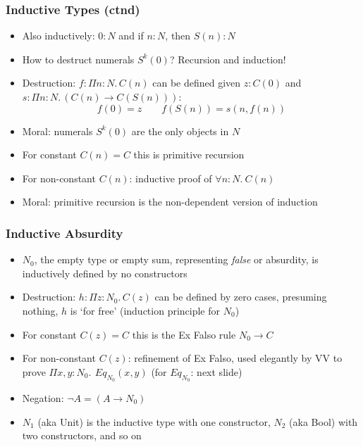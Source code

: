 \documentclass[handout]{beamer}
\newcommand{\depi}[3]{\Pi{#1{:}#2.\,#3}}
\begin{document}
\frame
  {

    \frametitle{Inductive Types (ctnd)}

    \begin{itemize}[<+->]
    \item Also inductively: $0:N$ and if $n:N$, then $S(n): N$
    \item How to destruct numerals $S^k (0)$? Recursion and induction!
    \item Destruction: $f: \depi{n}{N}{C(n)}$ can be defined
    given $z: C(0)$ and $s: \depi{n}{N}{(C(n)\to C(S(n)))}$:
     \[f(0)=z \quad\quad  f(S(n)) = s(n,f(n))\]
    \item Moral: numerals $S^k (0)$ are the only objects in $N$
     \item For constant $C(n)=C$ this is primitive recursion
     \item For non-constant $C(n)$: inductive proof of $\forall n{:}N.~C(n)$
     \item Moral: primitive recursion is the non-dependent version of induction
    \end{itemize}
  }


\frame
  {

    \frametitle{Inductive Absurdity}

    \begin{itemize}[<+->]
    \item $N_0$, the empty type or empty sum, representing \emph{false}
    or absurdity, is inductively defined by {\color{red}no} constructors
    \item Destruction: $h: \depi{z}{N_0}{C(z)}$ can be defined by {\color{red}zero} cases,
    presuming nothing, $h$ is `for free' (induction principle for $N_0$)
    \item For constant $C(z)=C$ this is the Ex Falso rule $N_0\to C$
    \item For non-constant $C(z)$: refinement of Ex Falso, used elegantly by
    VV to prove $\depi{x,y}{N_0}{~Eq_{N_0}(x,y)}$ (for $Eq_{N_0}$: next slide)
    \item Negation: $\neg A = (A\to N_0)$
    \item $N_1$ (aka Unit) is the inductive type with one constructor,
              $N_2$ (aka Bool) with two constructors, and so on
    \end{itemize}
  }
\end{document}

